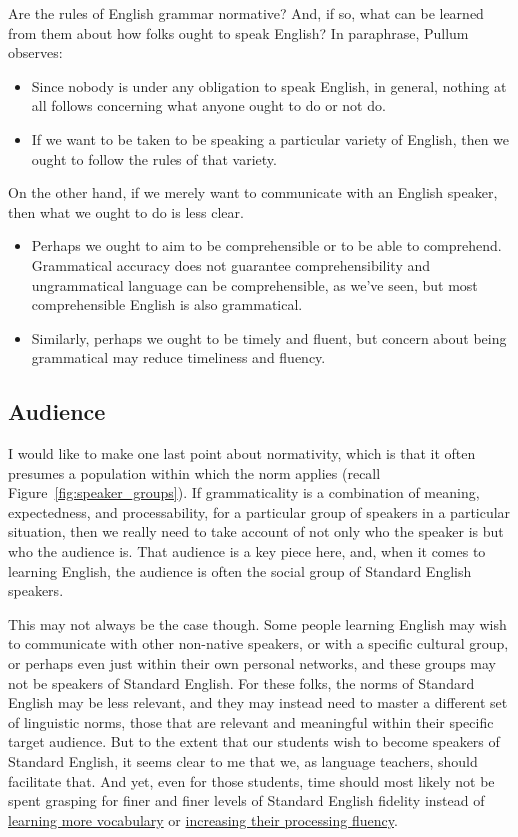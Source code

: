 Are the rules of English grammar normative? And, if so, what can be learned from them about how folks ought to speak English? In paraphrase, Pullum observes:
\begin{itemize}[noitemsep]
    \item Since nobody is under any obligation to speak English, in general, nothing at all follows concerning what anyone ought to do or not do.
    \item If we want to be taken to be speaking a particular variety of English, then we ought to follow the rules of that variety.
\end{itemize}

On the other hand, if we merely want to communicate with an English speaker, then what we ought to do is less clear.

\begin{itemize}[noitemsep]
    \item Perhaps we ought to aim to be comprehensible or to be able to comprehend. Grammatical accuracy does not guarantee comprehensibility and ungrammatical language can be comprehensible, as we've seen, but most comprehensible English is also grammatical.
    \item Similarly, perhaps we ought to be timely and fluent, but concern about being grammatical may reduce timeliness and fluency.
\end{itemize}

\subsection{Audience}

I would like to make one last point about normativity, which is that it often presumes a population within which the norm applies (recall Figure~\ref{fig:speaker_groups}). If grammaticality is a combination of meaning, expectedness, and processability, for a particular group of speakers in a particular situation, then we really need to take account of not only who the speaker is but who the audience is. That audience is a key piece here, and, when it comes to learning English, the audience is often the social group of Standard English speakers.

This may not always be the case though. Some people learning English may wish to communicate with other non-native speakers, or with a specific cultural group, or perhaps even just within their own personal networks, and these groups may not be speakers of Standard English. For these folks, the norms of Standard English may be less relevant, and they may instead need to master a different set of linguistic norms, those that are relevant and meaningful within their specific target audience. But to the extent that our students wish to become speakers of Standard English, it seems clear to me that we, as language teachers, should facilitate that. And yet, even for those students, time should most likely not be spent grasping for finer and finer levels of Standard English fidelity instead of \hyperref[ch:vocabulary]{learning more vocabulary} or \hyperref[ch:fluency]{increasing their processing fluency}. 


